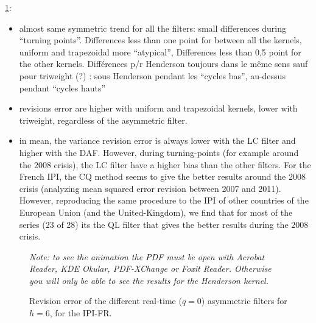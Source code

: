 \documentclass[
  12pt,
  ,
  a4paper]{article}
\newcommand\1{\mathds{1}}
\begin{document}
\ref{fig:filtersasymErr}:

\begin{itemize}
\item
  almost same symmetric trend for all the filters: small differences during ``turning points''.
  Differences less than one point for between all the kernels, uniform and trapezoidal more ``atypical'', Differences less than 0,5 point for the other kernels.
  Différences p/r Henderson toujours dans le même sens sauf pour triweight (?) : sous Henderson pendant les ``cycles bas'', au-dessus pendant ``cycles hauts''
\item
  revisions error are higher with uniform and trapezoidal kernels, lower with triweight, regardless of the asymmetric filter.
\item
  in mean, the variance revision error is always lower with the LC filter and higher with the DAF. However, during turning-points (for example around the 2008 crisis), the LC filter have a higher bias than the other filters. For the French IPI, the CQ method seems to give the better results around the 2008 crisis (analyzing mean squared error revision between 2007 and 2011). However, reproducing the same procedure to the IPI of other countries of the European Union (and the United-Kingdom), we find that for most of the series (23 of 28) its the QL filter that gives the better results during the 2008 crisis.
\end{itemize}

\begin{figure}[!ht]
\caption{Revision error of the different real-time ($q=0$) asymmetric filters for $h=6$, for the IPI-FR.}\label{fig:filtersasymErr}\footnotesize
\emph{Note: to see the animation the PDF must be open with Acrobat Reader, KDE Okular, PDF-XChange or Foxit Reader.
Otherwise you will only be able to see the results for the Henderson kernel.}
\end{figure}

\newpage

\printbibliography[title=References]
\end{document}
